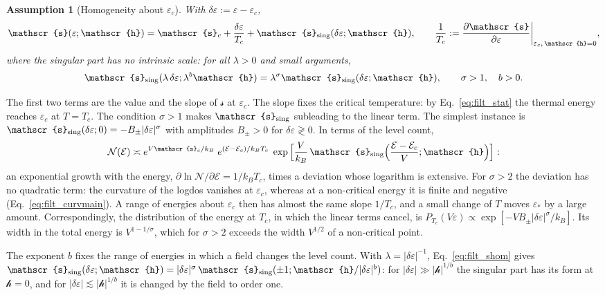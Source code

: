 \documentclass[10pt,a4paper]{article}
\theoremstyle{plain}
\newtheorem{assumption}{Assumption}
\newcommand{\cN}{\mathcal{N}}   %
\newcommand{\lndos}{{logdos}}  %
\newcommand{\hfield}{\mathscr{h}}  %
\newcommand{\enrg}{\mathcal{E}}  %
\newcommand{\lds}{\mathscr{s}}  %
\begin{document}
\begin{assumption}[Homogeneity about $\varepsilon_c$]\label{ass:crit}
With $\delta\varepsilon:=\varepsilon-\varepsilon_c$,
\begin{equation}\label{eq:filt_gcrit}
  \lds(\varepsilon;\hfield)=\lds_c+\frac{\delta\varepsilon}{T_c}
  +\lds_{\rm sing}(\delta\varepsilon;\hfield) ,
  \qquad
  \frac{1}{T_c}:=\frac{\partial \lds}{\partial\varepsilon}\bigg|_{\varepsilon_c,\,\hfield=0} ,
\end{equation}
where the singular part has no intrinsic scale: for all $\lambda>0$ and small
arguments,
\begin{equation}\label{eq:filt_shom}
  \lds_{\rm sing}(\lambda\,\delta\varepsilon;\lambda^{b}\hfield)=\lambda^{\sigma}\lds_{\rm sing}(\delta\varepsilon;\hfield) ,
  \qquad \sigma>1 ,\quad b>0 .
\end{equation}
\end{assumption}
The first two terms are the value and the slope of $\lds$ at $\varepsilon_c$.
The slope fixes the critical temperature: by Eq.~\eqref{eq:filt_stat} the
thermal energy reaches $\varepsilon_c$ at $T=T_c$. The condition $\sigma>1$
makes $\lds_{\rm sing}$ subleading to the linear term. The simplest instance
is $\lds_{\rm sing}(\delta\varepsilon;0)=-B_\pm|\delta\varepsilon|^{\sigma}$
with amplitudes $B_\pm>0$ for $\delta\varepsilon\gtrless0$. In terms of the
level count,
\[
  \cN(\enrg)\asymp e^{V\lds_c/k_B}\;e^{(\enrg-\enrg_c)/k_BT_c}\;
  \exp\Big[\frac{V}{k_B}\,\lds_{\rm sing}\Big(\frac{\enrg-\enrg_c}{V};\hfield\Big)\Big] :
\]
an exponential growth with the energy, $\partial\ln\cN/\partial\enrg=1/k_BT_c$,
times a deviation whose logarithm is extensive. For $\sigma>2$ the deviation
has no quadratic term: the curvature of the \lndos{} vanishes at
$\varepsilon_c$, whereas at a non-critical energy it is finite and negative
(Eq.~\eqref{eq:filt_curvmain}). A range of energies about $\varepsilon_c$
then has almost the same slope $1/T_c$, and a small change of $T$ moves
$\varepsilon_*$ by a large amount. Correspondingly, the distribution of the
energy at $T_c$, in which the linear terms cancel, is
$P_{T_c}(V\varepsilon)\propto\exp[-VB_\pm|\delta\varepsilon|^{\sigma}/k_B]$.
Its width in the total energy is $V^{1-1/\sigma}$, which for $\sigma>2$
exceeds the width $V^{1/2}$ of a non-critical point.

The exponent $b$ fixes the range of energies in which a field changes the
level count. With $\lambda=|\delta\varepsilon|^{-1}$,
Eq.~\eqref{eq:filt_shom} gives
$\lds_{\rm sing}(\delta\varepsilon;\hfield)
=|\delta\varepsilon|^{\sigma}\,\lds_{\rm sing}(\pm1;\hfield/|\delta\varepsilon|^{b})$:
for $|\delta\varepsilon|\gg|\hfield|^{1/b}$ the singular part has its form at
$\hfield=0$, and for $|\delta\varepsilon|\lesssim|\hfield|^{1/b}$ it is changed
by the field to order one.
\end{document}
